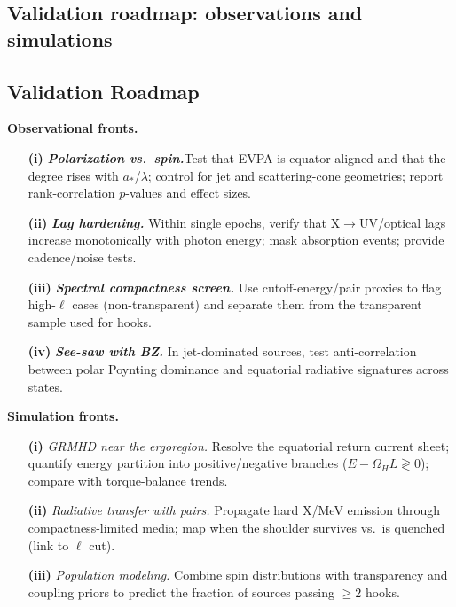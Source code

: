 \documentclass[twocolumn]{aastex701}
\begin{document}
\subsection*{Validation roadmap: observations and simulations}
\subsection{Validation Roadmap}\label{sec:roadmap}

\noindent\textbf{Observational fronts.}
\begin{enumerate}
  \item[\textbf{(i)}] \textit{\textbf{Polarization vs.\ spin.}}Test that EVPA is equator-aligned and that the degree rises with $a_\ast$/$\lambda$; control for jet and scattering-cone geometries; report rank-correlation $p$-values and effect sizes.
  \item[\textbf{(ii)}] \textit{\textbf{Lag hardening.}} Within single epochs, verify that X$\to$UV/optical lags increase monotonically with photon energy; mask absorption events; provide cadence/noise tests.
  \item[\textbf{(iii)}] \textit{\textbf{Spectral compactness screen.}} Use cutoff-energy/pair proxies to flag high-$\ell$ cases (non-transparent) and separate them from the transparent sample used for hooks.
  \item[\textbf{(iv)}] \textit{\textbf{See-saw with BZ.}} In jet-dominated sources, test anti-correlation between polar Poynting dominance and equatorial radiative signatures across states.
\end{enumerate}

\noindent\textbf{Simulation fronts.}
\begin{enumerate}
  \item[\textbf{(i)}] \textit{GRMHD near the ergoregion.} Resolve the equatorial return current sheet; quantify energy partition into positive/negative branches ($E-\Omega_H L\gtrless 0$); compare with torque-balance trends.
  \item[\textbf{(ii)}] \textit{Radiative transfer with pairs.} Propagate hard X/MeV emission through compactness-limited media; map when the shoulder survives vs.\ is quenched (link to $\ell$ cut).
  \item[\textbf{(iii)}] \textit{Population modeling.} Combine spin distributions with transparency and coupling priors to predict the fraction of sources passing $\ge 2$ hooks.
\end{enumerate}
\end{document}
